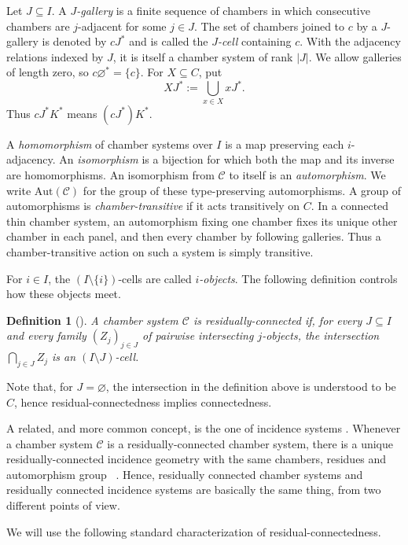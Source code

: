 \documentclass[11pt,letterpaper]{amsart}
\newtheorem{definition}[prop]{Definition}
\newcommand{\CC}{\mathcal{C}}
\newcommand{\Aut}{\mathrm{Aut}}
\begin{document}
Let $J\subseteq I$.  A \emph{$J$-gallery} is a finite sequence of chambers
in which consecutive chambers are $j$-adjacent for some $j\in J$.  The set
of chambers joined to $c$ by a $J$-gallery is denoted by $cJ^*$ and is called
the \emph{$J$-cell} containing $c$.  With the adjacency relations indexed by
$J$, it is itself a chamber system of rank $|J|$.  We allow galleries of
length zero, so $c\varnothing^*=\{c\}$.  For $X\subseteq C$, put
\[
    XJ^*:=\bigcup_{x\in X}xJ^*.
\]
Thus $cJ^*K^*$ means $(cJ^*)K^*$.


A \emph{homomorphism} of chamber systems over $I$ is a map preserving each
$i$-adjacency.  An \emph{isomorphism} is a bijection for which both the map
and its inverse are homomorphisms.  An isomorphism from $\CC$ to itself is
an \emph{automorphism}. We write $\Aut(\CC)$ for the group of these
type-preserving automorphisms.  A group of automorphisms is
\emph{chamber-transitive} if it acts transitively on $C$.  In a connected
thin chamber system, an automorphism fixing one chamber fixes its unique
other chamber in each panel, and then every chamber by following
galleries.  Thus a chamber-transitive action on such a system is simply
transitive.

For $i\in I$, the $(I\setminus\{i\})$-cells are called \emph{$i$-objects}.
The following definition controls how these objects meet.

\begin{definition}[{\cite[Section~3.4]{buekenhout2013diagram}}]
A chamber system $\CC$ is \emph{residually-connected} if, for every
$J\subseteq I$ and every family $(Z_j)_{j\in J}$ of pairwise intersecting
$j$-objects, the intersection $\bigcap_{j\in J}Z_j$ is an
$(I\setminus J)$-cell.
\end{definition}
Note that, for $J=\varnothing$, the intersection in the definition above is understood
to be $C$, hence residual-connectedness implies connectedness.

A related, and more common concept, is the one of incidence systems \cite[Chapter 1]{buekenhout2013diagram}. Whenever a chamber system
$\CC$ is a residually-connected chamber system, there is a unique residually-connected
incidence geometry with the same chambers, residues and automorphism group
~\cite{buekenhout2013diagram}. Hence, residually connected chamber systems and residually connected incidence systems are basically the same thing, from two different points of view.

We will use the following standard characterization of residual-connectedness.
\end{document}
